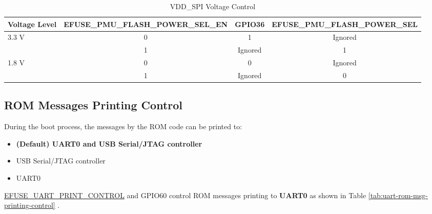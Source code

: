 \documentclass[main\_\_EN.tex]{subfiles}
\begin{document}
\begin{table}[H]
    \centering
    \caption{VDD\_SPI Voltage Control}
    \label{tab:vdd-spi-voltage-control}

    \begin{tabular}{ | l | c | c | c |}
    \hline
    
    \rowcolor{lightgray}
    \textbf{Voltage Level}  & 
    \textbf{EFUSE\_PMU\_FLASH\_POWER\_SEL\_EN} & \textbf{GPIO36} & \textbf{EFUSE\_PMU\_FLASH\_POWER\_SEL} \\\hline
    
    \multirow{2}{*}{3.3 V} &
    0 & 1 & Ignored \\ \cline{2-4} &
    1 & Ignored &1  \\\hline
     \multirow{2}{*}{1.8 V} &
     0 & 0 & Ignored \\ \cline{2-4} &
     1 & Ignored & 0  \\\hline

    \end{tabular}
\end{table}

\subsection{ROM Messages Printing Control}

During the boot process, the messages by the ROM code can be printed to:

\begin{itemize}
    \item \textbf{(Default) UART0 and USB Serial/JTAG controller}
    \item USB Serial/JTAG controller
    \item UART0
\end{itemize}
    
\hyperref[fielddesc:EFUSEUARTPRINTCONTROL]{EFUSE\_UART\_PRINT\_CONTROL} and GPIO60 control ROM messages printing to \textbf{UART0} as shown in Table \ref{tab:uart-rom-msg-printing-control} \textit{}.
\end{document}

